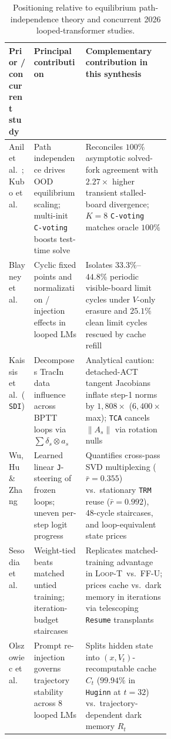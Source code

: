 \documentclass[10pt,letterpaper]{article}
\newcommand{\LoopT}{\textsc{Loop-T}}
\newcommand{\FFU}{\textsc{FF-U}}
\begin{document}
\begin{table}[t]
\centering
\small
\begin{tabularx}{\linewidth}{@{}l>{\raggedright\arraybackslash}p{0.32\linewidth}>{\raggedright\arraybackslash}X@{}}
\toprule
Prior / concurrent study & Principal contribution & Complementary contribution in this synthesis \\
\midrule
Anil et al.\ \cite{anil2022path}; Kubo et al.\ \cite{kubo2026cvoting} & Path independence drives OOD equilibrium scaling; multi-init \texttt{C-voting} boosts test-time solve & Reconciles $100\%$ asymptotic solved-fork agreement with $2.27\times$ higher transient stalled-board divergence; $K{=}8$ \texttt{C-voting} matches oracle $100\%$ \\
Blayney et al.\ \cite{blayney2026mechanistic} & Cyclic fixed points and normalization / injection effects in looped LMs & Isolates $33.3\%$--$44.8\%$ periodic visible-board limit cycles under $V$-only erasure and $25.1\%$ clean limit cycles rescued by cache refill \\
Kaissis et al.\ (\texttt{SDI}) \cite{kaissis2026sdi} & Decomposes TracIn data influence across BPTT loops via $\sum \delta_s \otimes a_s$ & Analytical caution: detached-ACT tangent Jacobians inflate step-1 norms by $1{,}808\times$ ($6{,}400\times$ max); \texttt{TCA} cancels $\|A_s\|$ via rotation nulls \\
Wu, Hu \& Zhang \cite{wu2026shared} & Learned linear \texttt{J}-steering of frozen loops; uneven per-step logit progress & Quantifies cross-pass SVD multiplexing ($\bar{r}=0.355$) vs.\ stationary \texttt{TRM} reuse ($\bar{r}=0.992$), 48-cycle staircases, and loop-equivalent state prices \\
Sesodia et al.\ \cite{sesodia2026inside} & Weight-tied beats matched untied training; iteration-budget staircases & Replicates matched-training advantage in \LoopT\ vs.\ \FFU; prices cache vs.\ dark memory in iterations via telescoping \texttt{Resume} transplants \\
Olszowiec et al.\ \cite{olszowiec2026monitoring} & Prompt re-injection governs trajectory stability across 8 looped LMs & Splits hidden state into $(x,V_t)$-recomputable cache $C_t$ ($99.94\%$ in \texttt{Huginn} at $t{=}32$) vs.\ trajectory-dependent dark memory $R_t$ \\
\bottomrule
\end{tabularx}
\caption{Positioning relative to equilibrium path-independence theory and concurrent 2026 looped-transformer studies.}
\label{tab:literature}
\end{table}
\end{document}
